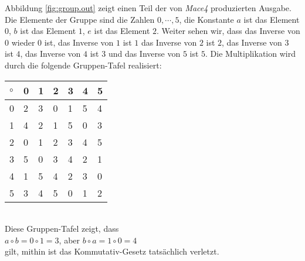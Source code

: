 Abbildung \ref{fig:group.out} zeigt einen Teil der von \textsl{Mace4} produzierten Ausgabe.
Die Elemente der Gruppe sind die Zahlen $0, \cdots, 5$, die Konstante $a$ ist das Element $0$,
$b$ ist das Element $1$, $e$ ist das Element $2$.  Weiter sehen wir, dass das Inverse von $0$ wieder $0$ ist,
das Inverse von $1$ ist $1$ das Inverse von $2$ ist $2$, das Inverse von $3$ ist $4$, das Inverse von $4$ ist
$3$ und das Inverse von $5$ ist $5$.  Die Multiplikation wird durch die folgende Gruppen-Tafel realisiert:
\\[0.2cm]
\hspace*{1.3cm}
\hspace*{1.3cm}
\begin{tabular}[t]{|l||l|l|l|l|l|l|}
\hline
$\circ$ & 0 & 1 & 2 & 3 & 4 & 5 \\
\hline
\hline
      0 & 2 & 3 & 0 & 1 & 5 & 4 \\
\hline
      1 & 4 & 2 & 1 & 5 & 0 & 3 \\
\hline
      2 & 0 & 1 & 2 & 3 & 4 & 5 \\
\hline
      3 & 5 & 0 & 3 & 4 & 2 & 1 \\
\hline
      4 & 1 & 5 & 4 & 2 & 3 & 0 \\
\hline
      5 & 3 & 4 & 5 & 0 & 1 & 2 \\
\hline
\end{tabular}
\\[0.2cm]
Diese Gruppen-Tafel zeigt, dass
\\[0.2cm]
\hspace*{1.3cm}
$a \circ b = 0 \circ 1 = 3$, \quad aber \quad
$b \circ a = 1 \circ 0 = 4$
\\[0.2cm]
gilt, mithin ist das Kommutativ-Gesetz tatsächlich verletzt.


